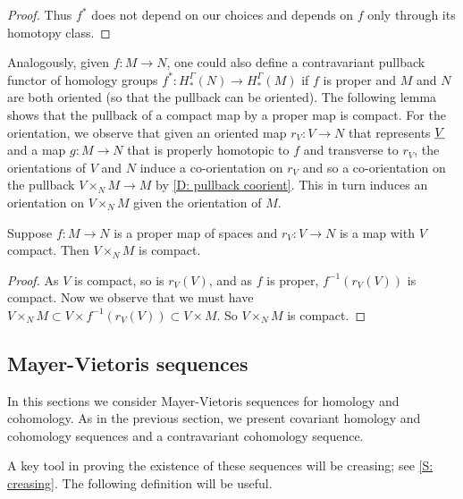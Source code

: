 \begin{proof}
	Thus $f^*$ does not depend on our choices and depends on $f$ only through its homotopy class.
\end{proof}

\begin{remark}\label{R: homology transfer}
	Analogously, given $f \colon M \to N$, one could also define a contravariant pullback functor of homology groups $f^*: H_*^\Gamma(N) \to H_*^\Gamma(M)$ if $f$ is proper and $M$ and $N$ are both oriented (so that the pullback can be oriented). The following lemma shows that the pullback of a compact map by a proper map is compact. For the orientation, we observe that given an oriented map $r_V \colon V \to N$ that represents $\underline{V}$ and a map $g \colon M \to N$ that is properly homotopic to $f$ and transverse to $r_V$, the orientations of $V$ and $N$ induce a co-orientation on $r_V$ and so a co-orientation on the pullback $V \times_N M \to M$ by \cref{D: pullback coorient}. This in turn induces an orientation on $V \times_N M$ given the orientation of $M$.
\end{remark}

\begin{lemma}\label{L: compact pullback}
	Suppose $f \colon M \to N$ is a proper map of spaces and $r_V \colon V \to N$ is a map with $V$ compact. Then $V \times_N M$ is compact.
\end{lemma}

\begin{proof}
	As $V$ is compact, so is $r_V(V)$, and as $f$ is proper, $f^{-1}(r_V(V))$ is compact. Now we observe that we must have $V \times_N M \subset V \times f^{-1}(r_V(V)) \subset V \times M$. So $V \times_N M$ is compact.
\end{proof}

\subsection{Mayer-Vietoris sequences}

In this sections we consider Mayer-Vietoris sequences for homology and cohomology. As in the previous section, we present covariant homology and cohomology sequences and a contravariant cohomology sequence.

A key tool in proving the existence of these sequences will be creasing; see \cref{S: creasing}. The following definition will be useful.

